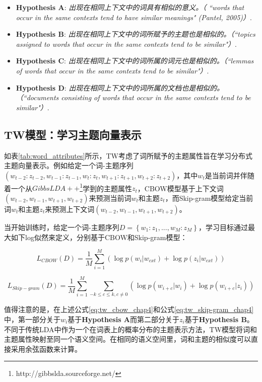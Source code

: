 \documentclass[master]{njuthesis}
\begin{document}
\begin{itemize}
\item \textbf{Hypothesis A}: {\em 出现在相同上下文中的词具有相似的意义。（ ``words that occur in the same contexts tend to have similar meanings" (Pantel, 2005)）}.
\item \textbf{Hypothesis B}: {\em 出现在相同上下文中的词所赋予的主题也是相似的。（``topics assigned to words that occur in the same contexts tend to be similar"）}.
\item \textbf{Hypothesis C}: {\em 出现在相同上下文中的词所属的词元也是相似的。（``lemmas of words that occur in the same contexts tend to be similar"）}.
\item \textbf{Hypothesis D}: {\em 出现在相同上下文中的词所属的文档也是相似的。（``documents consisting of words that occur in the same contexts tend to be similar"）}.
\end{itemize}

\subsection{TW模型：学习主题向量表示}\label{subsec_tw_chap4}

如表\ref{tab:word_attributes}所示，TW考虑了词所赋予的主题属性旨在学习分布式主题向量表示。例如给定一个词-主题序列$(w_{t-2}:z_{t-2}, w_{t-1}:z_{t-1}, w_t:z_t, w_{t+1}:z_{t+1}, w_{t+2}:z_{t+2})$，其中$w_t$是当前词并伴随着一个从$GibbsLDA++$\footnote{http://gibbslda.sourceforge.net/}学到的主题属性$z_t$，CBOW模型基于上下文词$(w_{t-2}, w_{t-1}, w_{t+1}, w_{t+2})$来预测当前词$w_t$和主题$z_t$，而Skip-gram模型给定当前词$w_t$和主题$z_t$来预测上下文词$(w_{t-2}, w_{t-1}, w_{t+1}, w_{t+2})$。

当开始训练时，给定一个词-主题序列$D=\left \{w_{1}:z_{1},...,w_{M}:z_{M}  \right \}$，学习目标通过最大如下log似然来定义，分别基于CBOW和Skip-gram模型：

	\begin{equation}\label{eq:tw_cbow_chap4}
	{L}_{CBOW}(D)=\frac{1}{M}\sum_{i=1}^{M}(\log p(w_{i}|w_{cxt})+\log p(z_{i}|w_{cxt}))
	\end{equation}
	
	\begin{equation}\label{eq:tw_skip-gram_chap4}
	{L}_{Skip-gram}(D)=\frac{1}{M}\sum_{i=1}^{M}\sum_{-k\leq c\leq k,c\neq 0}(\log p(w_{i+c}|w_{i})+\log p(w_{i+c}|z_{i}))
	\end{equation}

值得注意的是，在上述公式\ref{eq:tw_cbow_chap4}和公式\ref{eq:tw_skip-gram_chap4}中，第一部分关于$w_i$基于\textbf{Hypothesis A}而第二部分关于$z_i$基于\textbf{Hypothesis B}。不同于传统LDA中作为一个在词表上的概率分布的主题表示方法，TW模型将词和主题属性映射至同一个语义空间。在相同的语义空间里，词和主题的相似度可以直接采用余弦函数来计算。
\end{document}
